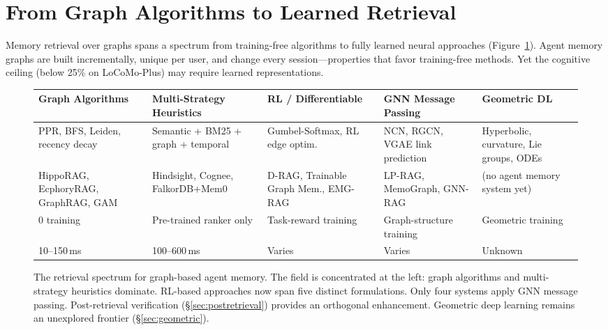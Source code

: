 \documentclass[hf]{ceurart}
\begin{document}
\section{From Graph Algorithms to Learned Retrieval}
\label{sec:retrieval}

Memory retrieval over graphs spans a spectrum from training-free
algorithms to fully learned neural approaches
(Figure~\ref{fig:spectrum}). Agent memory graphs are built
incrementally, unique per user, and change every session---properties
that favor training-free methods. Yet the cognitive ceiling
(below 25\% on LoCoMo-Plus) may require learned representations.

\begin{figure}[t]
\centering
\footnotesize
\setlength{\tabcolsep}{1.5pt}
\begin{tabular}{@{}p{}p{}p{}p{}p{}@{}}
\toprule
\textbf{Graph Algorithms} & \textbf{Multi-Strategy Heuristics} &
\textbf{RL / Differ\-entiable} & \textbf{GNN Message Passing} &
\textbf{Geometric DL} \\
\midrule
PPR, BFS, Leiden, recency decay &
Semantic + BM25 + graph + temporal &
Gumbel-Softmax, RL edge optim. &
NCN, RGCN, VGAE link prediction &
Hyperbolic, curvature, Lie groups, ODEs \\[3pt]
\scriptsize HippoRAG, Ecphory\-RAG, GraphRAG, GAM &
\scriptsize Hindsight, Cognee, FalkorDB+Mem0 &
\scriptsize D-RAG, Trainable Graph Mem., EMG-RAG &
\scriptsize LP-RAG, MemoGraph, GNN-RAG &
\scriptsize (no agent memory system yet) \\[2pt]
\scriptsize 0 training & \scriptsize Pre-trained ranker only &
\scriptsize Task-reward training & \scriptsize Graph-structure training &
\scriptsize Geometric training \\
\scriptsize 10--150\,ms & \scriptsize 100--600\,ms &
\scriptsize Varies & \scriptsize Varies &
\scriptsize Unknown \\
\bottomrule
\end{tabular}
\caption{The retrieval spectrum for graph-based agent memory. The
field is concentrated at the left: graph algorithms and multi-strategy
heuristics dominate. RL-based approaches now span five distinct
formulations. Only four systems apply GNN message passing. Post-retrieval
verification (\S\ref{sec:postretrieval}) provides an orthogonal
enhancement. Geometric deep learning remains an unexplored frontier
(\S\ref{sec:geometric}).}
\label{fig:spectrum}
\end{figure}
\end{document}
